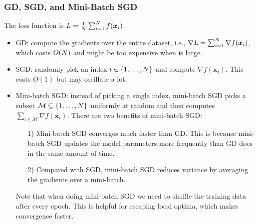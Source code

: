     
    
    \subsubsection{GD, SGD, and Mini-Batch SGD}
        The loss function is $L = \frac{1}{N}\sum_{i=1}^{N}{f(\bm{x}_i)}$.
        \begin{itemize}
            \item GD: compute the gradients over the entire dataset, i.e., $\nabla L = \sum_{i=1}^{N}{\nabla f(\bm{x}_i)}$, which costs $O(N)$ and might be too expensive when \ndata is large.
            \item SGD: randomly pick an index $i \in \{ 1, \ldots, N \}$ and compute $\nabla f(\bm{x}_i)$. This costs $O(1)$ but may oscillate a lot.
            \item Mini-batch SGD: instead of picking a single index, mini-batch SGD picks a subset $\mathcal{M} \subseteq \{ 1, \ldots, N \}$ uniformly at random and then computes $\sum_{i \in \mathcal{M}}^{}{\nabla f(\bm{x}_i)}$.
            There are two benefits of mini-batch SGD:
                \begin{itemize}
                    \item[1)] Mini-batch SGD converges much faster than GD.
                    This is because mini-batch SGD updates the model parameters more frequently than GD does in the same amount of time.
                    \item[2)] Compared with SGD, mini-batch SGD reduces variance by averaging the gradients over a mini-batch.
                \end{itemize}
            Note that when doing mini-batch SGD we need to shuffle the training data after every epoch.
            This is helpful for escaping local optima, which makes convergence faster.
        \end{itemize}
        
